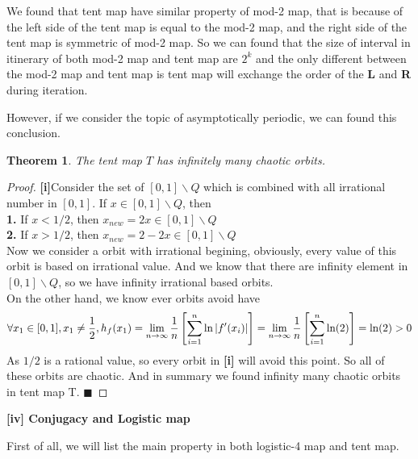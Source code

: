 \documentclass[12pt]{article}
\theoremstyle{plain}
\newtheorem{theorem}{\textbf{Theorem}}[section]
\newtheorem{proof}{\textit{PROOF}}[section]
\begin{document}
We found that tent map have similar property of mod-2 map, that is because of the left side of the tent map is equal to the mod-2 map, and the right side of the tent map is symmetric of mod-2 map. So we can found that the size of interval in itinerary of both mod-2 map and tent map are $2^{k}$ and the only different between the mod-2 map and tent map is tent map will exchange the order of the \textbf{L} and \textbf{R} during iteration. 

However, if we consider the topic of asymptotically periodic, we can found this conclusion.

\begin{theorem} The tent map $T$ has infinitely many chaotic orbits.
\end{theorem}

{\color{blue}
\begin{proof} \textbf{[i]}Consider the set of $[0, 1]\backslash Q$ which is combined with all irrational number in $[0, 1]$. If $x \in [0, 1]\backslash Q$, then
\\\noindent \textbf{1.} If $x < 1/2$, then $x_{new} = 2x \in [0, 1]\backslash Q$
\\\noindent \textbf{2.} If $x > 1/2$, then $x_{new} = 2 - 2x \in [0, 1]\backslash Q$
\\\noindent Now we consider a orbit with irrational begining, obviously, every value of this orbit is based on irrational value. And we know that there are infinity element in $[0, 1]\backslash Q$, so we have infinity irrational based orbits.\\[1ex]

  \noindent On the other hand, we know ever orbits avoid have
$$
\forall x_1 \in [0, 1], x_1 \neq {1\over 2}, h_{f}(x_1) = \lim_{n \rightarrow \infty}{1\over n}\left[\sum_{i = 1}^{n}\ln\left|f'(x_i)\right|\right] = \lim_{n \rightarrow \infty}{1\over n}\left[\sum_{i = 1}^{n} \ln(2)\right] = \ln(2) > 0
$$
As $1/2$ is a rational value, so every orbit in \textbf{[i]} will avoid this point. So all of these orbits are chaotic. And in summary we found infinity many chaotic orbits in tent map T. $\blacksquare$
\end{proof}
}








\textbf{[iv] Conjugacy and Logistic map}

First of all, we will list the main property in both logistic-4 map and tent map.
\end{document}
